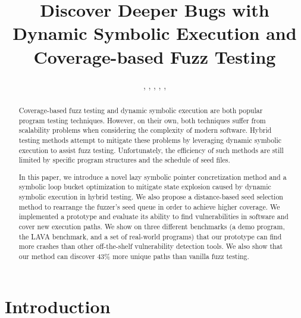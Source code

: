 \documentclass{cta-author}
\begin{document}

\title{Discover Deeper Bugs with Dynamic Symbolic Execution and Coverage-based Fuzz Testing}

\author{, , , , ,  }
%
\address{
}

\begin{abstract}
Coverage-based fuzz testing and dynamic symbolic execution are both popular program testing techniques. However, on their own, both techniques suffer from scalability problems when considering the complexity of modern software. Hybrid testing methods attempt to mitigate these problems by leveraging dynamic symbolic execution to assist fuzz testing. Unfortunately, the efficiency of such methods are still limited by specific program structures and the schedule of seed files.

In this paper, we introduce a novel lazy symbolic pointer concretization method and a symbolic loop bucket optimization to mitigate state explosion caused by dynamic symbolic execution in hybrid testing.
We also propose a distance-based seed selection method to rearrange the fuzzer's seed queue in order to achieve higher coverage. We implemented a prototype and evaluate its ability to find vulnerabilities in software and cover new execution paths. We show on three different benchmarks (a demo program, the LAVA benchmark, and a set of real-world programs) that our prototype can find more crashes than other off-the-shelf vulnerability detection tools. We also show that our method can discover 43\% more unique paths than vanilla fuzz testing.
\end{abstract}

\maketitle

\section{Introduction} \label{sec:introduction}

\end{document}
